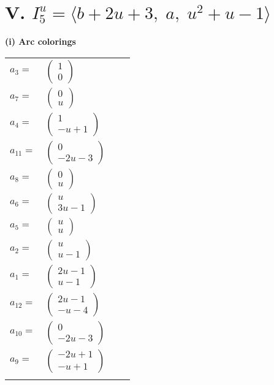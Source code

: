 \documentclass[1p]{elsarticle_modified}
\theoremstyle{definition}
\begin{document}
\centering \section*{V. $I^u_{5}= \langle b+2 u+3,\;a,\;u^2+u-1 \rangle$}
\flushleft \textbf{(i) Arc colorings}\\
\begin{tabular}{m{7pt} m{180pt} m{7pt} m{180pt} }
\flushright $a_{3}=$&$\begin{pmatrix}1\\0\end{pmatrix}$ \\
\flushright $a_{7}=$&$\begin{pmatrix}0\\u\end{pmatrix}$ \\
\flushright $a_{4}=$&$\begin{pmatrix}1\\- u+1\end{pmatrix}$ \\
\flushright $a_{11}=$&$\begin{pmatrix}0\\-2 u-3\end{pmatrix}$ \\
\flushright $a_{8}=$&$\begin{pmatrix}0\\u\end{pmatrix}$ \\
\flushright $a_{6}=$&$\begin{pmatrix}u\\3 u-1\end{pmatrix}$ \\
\flushright $a_{5}=$&$\begin{pmatrix}u\\u\end{pmatrix}$ \\
\flushright $a_{2}=$&$\begin{pmatrix}u\\u-1\end{pmatrix}$ \\
\flushright $a_{1}=$&$\begin{pmatrix}2 u-1\\u-1\end{pmatrix}$ \\
\flushright $a_{12}=$&$\begin{pmatrix}2 u-1\\- u-4\end{pmatrix}$ \\
\flushright $a_{10}=$&$\begin{pmatrix}0\\-2 u-3\end{pmatrix}$ \\
\flushright $a_{9}=$&$\begin{pmatrix}-2 u+1\\- u+1\end{pmatrix}$\\&\end{tabular}
\end{document}
